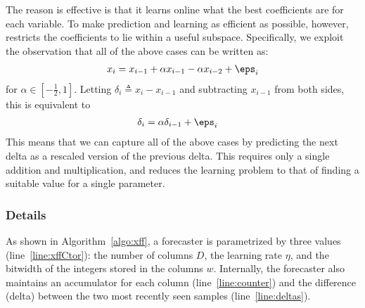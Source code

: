 
The reason \fire is effective is that it learns online what the best coefficients are for each variable.
To make prediction and learning as efficient as possible, however, \fire restricts the coefficients to lie within a useful subspace. Specifically, we exploit the observation that all of the above cases can be written as:
\begin{align}
    x_i = x_{i-1} + \alpha x_{i-1} - \alpha x_{i-2} + \eps_i
\end{align}
for $\alpha \in [-\frac{1}{2}, 1]$. Letting $\delta_i \triangleq x_i - x_{i-1}$ and subtracting $x_{i-1}$ from both sides, this is equivalent to
\begin{align}
    \delta_i &= \alpha \delta_{i-1} + \eps_i
\end{align}
This means that we can capture all of the above cases by predicting the next delta as a rescaled version of the previous delta. This requires only a single addition and multiplication, and reduces the learning problem to that of finding a suitable value for a single parameter.

\subsubsection{Details}
As shown in Algorithm~\ref{algo:xff}, a \fire forecaster is parametrized by three values (line~\ref{line:xffCtor}): the number of columns $D$, the learning rate $\eta$, and the bitwidth of the integers stored in the columns $w$. Internally, the forecaster also maintains an accumulator for each column (line~\ref{line:counter}) and the difference (delta) between the two most recently seen samples (line~\ref{line:deltas}).

